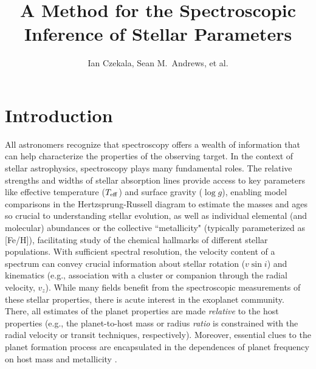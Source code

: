 \documentclass[iop,floatfix]{emulateapj}
\begin{document}
\graphicspath{{figs/}}



\title{A Method for the Spectroscopic Inference of Stellar Parameters}
\author{Ian Czekala, Sean M.~Andrews, et al.}

\section{Introduction} \label{sec:intro}

All astronomers recognize that spectroscopy offers a wealth of information that can help
characterize the properties of the observing target.  In the context of stellar astrophysics, 
spectroscopy plays many fundamental roles.  The relative strengths and widths of stellar absorption 
lines provide access to key parameters like effective temperature ($T_{\rm eff}$) and surface 
gravity ($\log g$), enabling model comparisons in the Hertzsprung-Russell diagram to estimate the 
masses and ages so crucial to understanding stellar evolution, as well as individual elemental (and 
molecular) abundances or the collective ``metallicity" (typically parameterized as [Fe/H]), 
facilitating study of the chemical hallmarks of different stellar populations.  With sufficient 
spectral resolution, the velocity content of a spectrum can convey crucial information about 
stellar rotation ($v \sin i$) and kinematics (e.g., association with a cluster or companion through 
the radial velocity, $v_z$).  While many fields benefit from the spectroscopic measurements of 
these stellar properties, there is acute interest in the exoplanet community.  There, all estimates 
of the planet properties are made {\it relative} to the host properties (e.g., the planet-to-host 
mass or radius {\it ratio} is constrained with the radial velocity or transit techniques, 
respectively).  Moreover, essential clues to the planet formation process are encapsulated in the 
dependences of planet frequency on host mass \citep[e.g.,][]{johnson07,howard10} and metallicity 
\citep[e.g.,][]{fischer05,buchhave14}.   
\end{document}
